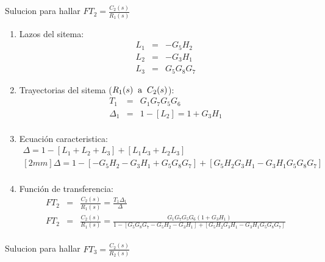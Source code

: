 \documentclass[12pt]{article}
\begin{document}
Sulucion para hallar \( \displaystyle FT_{2}=\frac{C_{2}(s)}{R_{1}(s)} \)

\begin{enumerate}
  \item Lazos del sitema:
    \begin{eqnarray*}
      L_{1} &=& - G_{5}H_{2} \\
      L_{2} &=& - G_{3}H_{1} \\
      L_{3} &=& G_{5}G_{8}G_{7}
    \end{eqnarray*}
  \item Trayectorias del sitema ($R_{1}(s) \hspace{2mm} \text{a} \hspace{2mm} C_{2}(s)$):
    \begin{eqnarray*}
      T_{1} &=& G_{1}G_{7}G_{5}G_{6} \\
      \Delta_{1} &=& 1-[L_{2}]=1+G_{3}H_{1} \\
    \end{eqnarray*}
  \item Ecuaci\'on caracteristica:
    \begin{eqnarray*}
      \Delta = 1-[L_{1}+L_{2}+L_{3}]+[L_{1}L_{3}+L_{2}L_{3}] \\ [2mm]
      \Delta = 1-[-G_{5}H_{2}-G_{3}H_{1}+G_{5}G_{8}G_{7}]+[G_{5}H_{2}G_{3}H_{1}-G_{3}H_{1}G_{5}G_{8}G_{7}]\\
    \end{eqnarray*}
  \item Funci\'on de transferencia:
    \begin{eqnarray*}
      FT_{2} &=& \frac{C_{2}(s)}{R_{1}(s)}=\frac{T_{1}\Delta_{1}}{\Delta} \\[5mm]
      FT_{2} &=&\frac{C_{2}(s)}{R_{1}(s)} = \frac{G_{1}G_{7}G_{5}G_{6}(1+G_{3}H_{1})}{1-[G_{5}G_{8}G_{7}-G_{5}H_{2}-G_{3}H_{1}]+[G_{5}H_{2}G_{3}H_{1}-G_{3}H_{1}G_{5}G_{8}G_{7}]} \\
    \end{eqnarray*}
\end{enumerate}

Sulucion para hallar \( \displaystyle FT_{3}=\frac{C_{2}(s)}{R_{2}(s)} \)
\end{document}
